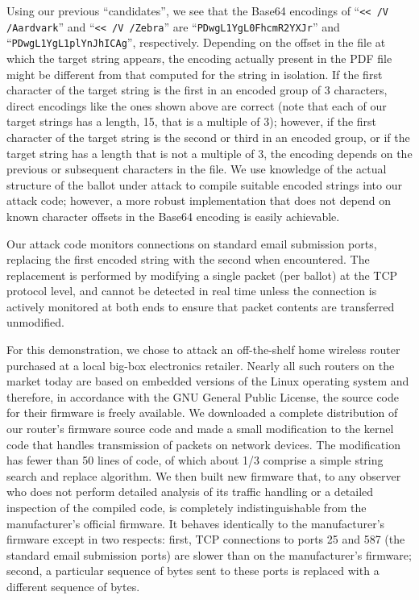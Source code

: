 \documentclass{article}
\begin{document}
Using our previous ``candidates'', we see that the Base64 encodings of
``\texttt{<{}< /V /Aardvark}'' and ``\texttt{<{}< /V
  /Zebra\textvisiblespace\textvisiblespace\textvisiblespace}'' are
``\texttt{PDwgL1YgL0FhcmR2YXJr}'' and
``\texttt{PDwgL1YgL1plYnJhICAg}'', respectively. Depending on the
offset in the file at which the target string appears, the encoding
actually present in the PDF file might be different from that computed
for the string in isolation. If the first character of the target
string is the first in an encoded group of 3 characters, direct
encodings like the ones shown above are correct (note that each of our
target strings has a length, 15, that is a multiple of 3); however, if
the first character of the target string is the second or third in an
encoded group, or if the target string has a length that is not a
multiple of 3, the encoding depends on the previous or subsequent
characters in the file. We use knowledge of the actual structure of
the ballot under attack to compile suitable encoded strings into our
attack code; however, a more robust implementation that does not
depend on known character offsets in the Base64 encoding is easily
achievable.

Our attack code monitors connections on standard email submission
ports, replacing the first encoded string with the second when
encountered. The replacement is performed by modifying a single packet
(per ballot) at the TCP protocol level, and cannot be detected in real
time unless the connection is actively monitored at both ends to
ensure that packet contents are transferred unmodified.

For this demonstration, we chose to attack an off-the-shelf home
wireless router purchased at a local big-box electronics
retailer. Nearly all such routers on the market today are based on
embedded versions of the Linux operating system and therefore, in
accordance with the GNU General Public License, the source code for
their firmware is freely available. We downloaded a complete
distribution of our router's firmware source code and made a small
modification to the kernel code that handles transmission of packets
on network devices. The modification has fewer than 50 lines of code,
of which about 1/3 comprise a simple string search and replace
algorithm. We then built new firmware that, to any observer who does
not perform detailed analysis of its traffic handling or a detailed
inspection of the compiled code, is completely indistinguishable from
the manufacturer's official firmware. It behaves identically to the
manufacturer's firmware except in two respects: first, TCP connections
to ports 25 and 587 (the standard email submission ports) are slower
than on the manufacturer's firmware; second, a particular sequence of
bytes sent to these ports is replaced with a different sequence of
bytes.
\end{document}
